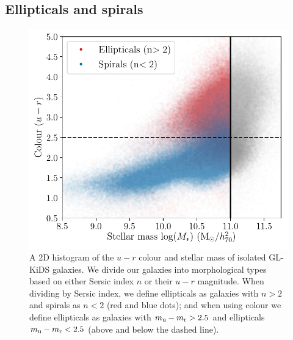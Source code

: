 \documentclass[usenatbib]{mnras}
\newcommand{\un}[1]{_{\rm #1}}
\begin{document}
\subsection{Ellipticals and spirals}
\label{sec:results-types}

\begin{figure}
	\includegraphics[width=\columnwidth]{Figures/galaxy_morphology_color_u-r.pdf}
	\caption{A 2D histogram of the $u-r$ colour and stellar mass of isolated GL-KiDS galaxies. We divide our galaxies into morphological types based on either Sersic index $n$ or their $u-r$ magnitude. When dividing by Sersic index, we define ellipticals as galaxies with $n>2$ and spirals as $n<2$ (red and blue dots); and when using colour we define ellipticals as galaxies with $m\un{u} - m\un{r} > 2.5$ and ellipticals $m\un{u} - m\un{r} < 2.5$ (above and below the dashed line).}
	\label{fig:galtypes_scatterplot}
\end{figure}
\end{document}
